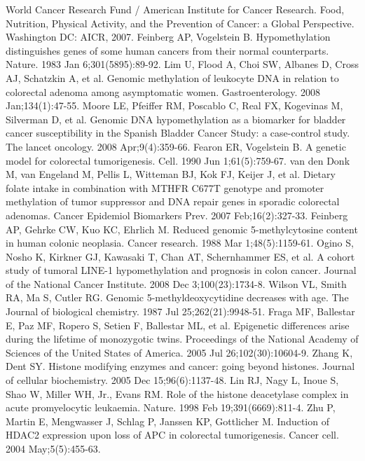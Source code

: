 \begin{thebibliography}{12}
		World Cancer Research Fund / American Institute for Cancer Research. Food, Nutrition, Physical Activity, and the Prevention of Cancer: a Global Perspective. Washington DC: AICR, 2007. 
		Feinberg AP, Vogelstein B. Hypomethylation distinguishes genes of some human cancers from their normal counterparts. Nature. 1983 Jan 6;301(5895):89-92. 
		Lim U, Flood A, Choi SW, Albanes D, Cross AJ, Schatzkin A, et al. Genomic methylation of leukocyte DNA in relation to colorectal adenoma among asymptomatic women. Gastroenterology. 2008 Jan;134(1):47-55. 
		Moore LE, Pfeiffer RM, Poscablo C, Real FX, Kogevinas M, Silverman D, et al. Genomic DNA hypomethylation as a biomarker for bladder cancer susceptibility in the Spanish Bladder Cancer Study: a case-control study. The lancet oncology. 2008 Apr;9(4):359-66. 
		Fearon ER, Vogelstein B. A genetic model for colorectal tumorigenesis. Cell. 1990 Jun 1;61(5):759-67. 
		van den Donk M, van Engeland M, Pellis L, Witteman BJ, Kok FJ, Keijer J, et al. Dietary folate intake in combination with MTHFR C677T genotype and promoter methylation of tumor suppressor and DNA repair genes in sporadic colorectal adenomas. Cancer Epidemiol Biomarkers Prev. 2007 Feb;16(2):327-33. 
		Feinberg AP, Gehrke CW, Kuo KC, Ehrlich M. Reduced genomic 5-methylcytosine content in human colonic neoplasia. Cancer research. 1988 Mar 1;48(5):1159-61. 
		Ogino S, Nosho K, Kirkner GJ, Kawasaki T, Chan AT, Schernhammer ES, et al. A cohort study of tumoral LINE-1 hypomethylation and prognosis in colon cancer. Journal of the National Cancer Institute. 2008 Dec 3;100(23):1734-8. 
		Wilson VL, Smith RA, Ma S, Cutler RG. Genomic 5-methyldeoxycytidine decreases with age. The Journal of biological chemistry. 1987 Jul 25;262(21):9948-51. 
		Fraga MF, Ballestar E, Paz MF, Ropero S, Setien F, Ballestar ML, et al. Epigenetic differences arise during the lifetime of monozygotic twins. Proceedings of the National Academy of Sciences of the United States of America. 2005 Jul 26;102(30):10604-9. 
		Zhang K, Dent SY. Histone modifying enzymes and cancer: going beyond histones. Journal of cellular biochemistry. 2005 Dec 15;96(6):1137-48. 
		Lin RJ, Nagy L, Inoue S, Shao W, Miller WH, Jr., Evans RM. Role of the histone deacetylase complex in acute promyelocytic leukaemia. Nature. 1998 Feb 19;391(6669):811-4. 
		Zhu P, Martin E, Mengwasser J, Schlag P, Janssen KP, Gottlicher M. Induction of HDAC2 expression upon loss of APC in colorectal tumorigenesis. Cancer cell. 2004 May;5(5):455-63. 

\end{thebibliography}
